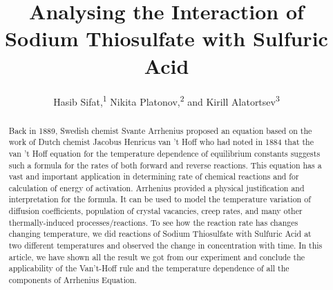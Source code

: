 \documentclass[a4paper, 12pt]{article}%
\newcommand\authormark[1]{\textsuperscript{#1}}
\begin{document}
\title{Analysing the Interaction of Sodium Thiosulfate with Sulfuric Acid}


\author{Hasib Sifat,\authormark{1} Nikita Platonov,\authormark{2} and Kirill Alatortsev\authormark{3}}

\address{\authormark{1} Faculty of Physical and Quantum Electronics, 
\authormark{2,3}Faculty of Aerophysics and Space Research,  \authormark{1,2,3}Moscow Institute of Physics and Technology, Institutskiy Pereulok, 9, Dolgoprudny, Moscow Oblast, Russian Federation, 141701}




\begin{abstract}Back in 1889, Swedish chemist Svante Arrhenius proposed an equation based on the work of Dutch chemist Jacobus Henricus van 't Hoff who had noted in 1884 that the van 't Hoff equation for the temperature dependence of equilibrium constants suggests such a formula for the rates of both forward and reverse reactions. This equation has a vast and important application in determining rate of chemical reactions and for calculation of energy of activation. Arrhenius provided a physical justification and interpretation for the formula. It can be used to model the temperature variation of diffusion coefficients, population of crystal vacancies, creep rates, and many other thermally-induced processes/reactions. To see how the reaction rate has changes changing temperature, we did reactions of Sodium Thiosulfate with Sulfuric Acid at two different temperatures and observed the change in concentration with time. In this article, we have shown all the result we got from our experiment and conclude the applicability of the Van't-Hoff rule and the temperature dependence of all the components of Arrhenius Equation.
\end{abstract}
\end{document}
